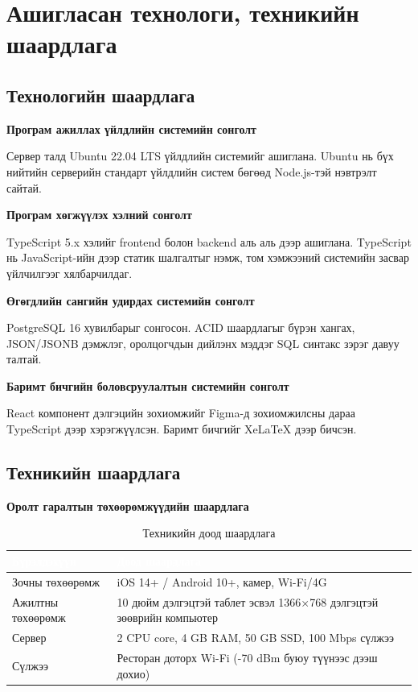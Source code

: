 \section{Ашигласан технологи, техникийн шаардлага}

\subsection{Технологийн шаардлага}

\textbf{Програм ажиллах үйлдлийн системийн сонголт}

Сервер талд Ubuntu 22.04 LTS үйлдлийн системийг ашиглана. Ubuntu нь бүх нийтийн
серверийн стандарт үйлдлийн систем бөгөөд Node.js-тэй нэвтрэлт сайтай.

\textbf{Програм хөгжүүлэх хэлний сонголт}

TypeScript 5.x хэлийг frontend болон backend аль аль дээр ашиглана. TypeScript нь
JavaScript-ийн дээр статик шалгалтыг нэмж, том хэмжээний системийн засвар
үйлчилгээг хялбарчилдаг.

\textbf{Өгөгдлийн сангийн удирдах системийн сонголт}

PostgreSQL 16 хувилбарыг сонгосон. ACID шаардлагыг бүрэн хангах, JSON/JSONB
дэмжлэг, оролцогчдын дийлэнх мэддэг SQL синтакс зэрэг давуу талтай.

\textbf{Баримт бичгийн боловсруулалтын системийн сонголт}

React компонент дэлгэцийн зохиомжийг Figma-д зохиомжилсны дараа TypeScript дээр
хэрэгжүүлсэн. Баримт бичгийг XeLaTeX дээр бичсэн.

\subsection{Техникийн шаардлага}

\textbf{Оролт гаралтын төхөөрөмжүүдийн шаардлага}

\begin{table}[htbp]
\caption{Техникийн доод шаардлага}
\label{tab:hw}
\centering
\small
\begin{tabularx}{\textwidth}{|L|L|}
\hline
{}
\textcolor{white}{\textbf{Бүрэлдэхүүн}} &
\textcolor{white}{\textbf{Доод шаардлага}} \\ \hline
Зочны төхөөрөмж & iOS 14+ / Android 10+, камер, Wi-Fi/4G \\ \hline
{}
Ажилтны төхөөрөмж & 10 дюйм дэлгэцтэй таблет эсвэл 1366×768 дэлгэцтэй зөөврийн компьютер \\ \hline
Сервер & 2 CPU core, 4 GB RAM, 50 GB SSD, 100 Mbps сүлжээ \\ \hline
{}
Сүлжээ & Ресторан доторх Wi-Fi (-70 dBm буюу түүнээс дээш дохио) \\ \hline
\end{tabularx}
\end{table}


